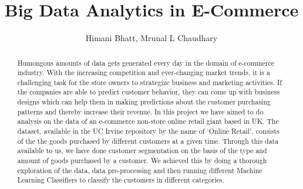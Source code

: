 

%



\title{Big Data Analytics in E-Commerce}


\author{Himani Bhatt, Mrunal L Chaudhary}



\renewcommand{\shortauthors}{H. Bhatt, Mrual C.}

\begin{abstract}
Humongous amounts of data gets generated every day in the domain of e-commerce industry. With the increasing competition and ever-changing market trends, it is a challenging task for the store owners to strategize business and marketing activities. If the companies are able to predict customer behavior, they can come up with business designs which can help them in making predictions about the customer purchasing patterns and thereby increase their revenue. In this project we have aimed to do analysis on the data of an e-commerce non-store online retail giant based in UK. The dataset, available in the UC Irvine repository by the name of `Online Retail', consists of the the goods purchased by different customers at a given time. Through this data available to us, we have done customer segmentation on the basis of the type and amount of goods purchased by a customer. We achieved this by doing a thorough exploration of the data, data pre-processing and then running different Machine Learning Classifiers to classify the customers in different categories.

\end{abstract}



\maketitle

